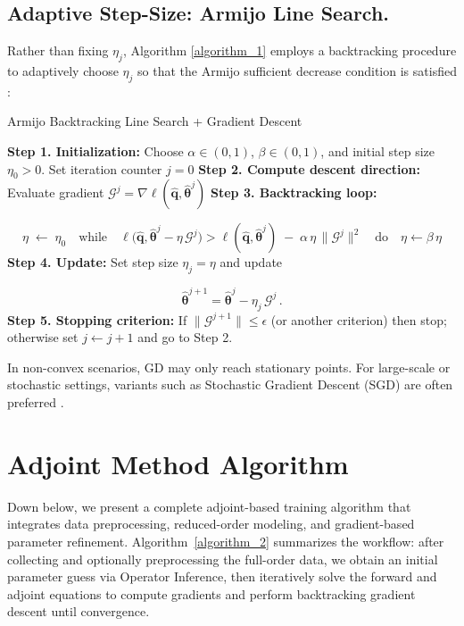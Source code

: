 \subsection*{Adaptive Step-Size: Armijo Line Search.} 
Rather than fixing $\eta_j$, Algorithm \ref{algorithm_1} employs a backtracking procedure to adaptively choose $\eta_j$ so that the Armijo sufficient decrease condition is satisfied \cite{nocedal1999numerical}:

\begin{center}
\begin{minipage}{0.95\textwidth}
\begin{algorithm}[H]
\label{algorithm_1}
\SetAlgoLined
\caption{Armijo Backtracking Line Search + Gradient Descent}
\textbf{Step 1. Initialization:} Choose $\alpha\in(0,1)$, $\beta\in(0,1)$, and initial step size $\eta_{0} > 0$. Set iteration counter $j=0$\;
\textbf{Step 2. Compute descent direction:} Evaluate gradient $\mathscr{G}^j = \nabla \ell(\hat{\mathbf{q}},\hat{\bm\theta}^j)$\;
\textbf{Step 3. Backtracking loop:}

$$\eta \;\leftarrow\;\eta_{0}
    \quad\text{while}\quad
    \ell\bigl(\hat{\mathbf{q}},\hat{\bm\theta}^j - \eta\,\mathscr{G}^j\bigr)
    >
    \ell(\hat{\mathbf{q}},\hat{\bm\theta}^j)
    \;-\;\alpha\,\eta\,\|\mathscr{G}^j\|^2
    \quad\text{do}\quad
    \eta \leftarrow \beta\,\eta$$
\textbf{Step 4. Update:} Set step size $\eta_j = \eta$ and update

$$\hat{\bm\theta}^{j+1} = \hat{\bm\theta}^j - \eta_j\,\mathscr{G}^j\,.$$
\textbf{Step 5. Stopping criterion:} If $\|\mathscr{G}^{j+1}\|\le\epsilon$ (or another criterion) then stop; otherwise set $j\leftarrow j+1$ and go to Step 2.
\end{algorithm}
\end{minipage}
\end{center}


In non-convex scenarios, GD may only reach stationary points.  For large-scale or stochastic settings, variants such as Stochastic Gradient Descent (SGD) are often preferred \cite{ruder2017overviewgradientdescentoptimization}.



\section{Adjoint Method Algorithm}

Down below, we present a complete adjoint-based training algorithm that integrates data preprocessing, reduced-order modeling, and gradient-based parameter refinement. Algorithm~\ref{algorithm_2} summarizes the workflow: after collecting and optionally preprocessing the full-order data, we obtain an initial parameter guess via Operator Inference, then iteratively solve the forward and adjoint equations to compute gradients and perform backtracking gradient descent until convergence.

